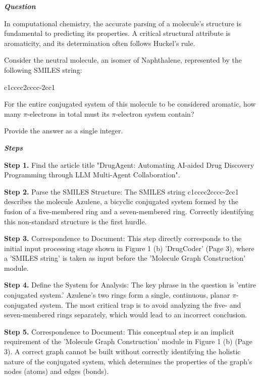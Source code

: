 \begin{tcolorbox}[
    breakable,
    title=Example of Scientific Deep Research in Chemistry,
    colback=LighterGray,
    colframe=DeepPurple,
    colbacktitle=DeepPurple,
    coltitle=White,
]
\textbf{\emph{\textcolor{DeepPurple}{Question}}}

In computational chemistry, the accurate parsing of a molecule's structure is fundamental to predicting its properties. A critical structural attribute is aromaticity, and its determination often follows Huckel's rule.

Consider the neutral molecule, an isomer of Naphthalene, represented by the following SMILES string:

c1cccc2cccc-2cc1

For the entire conjugated system of this molecule to be considered aromatic, how many $\pi$-electrons in total must its $\pi$-electron system contain?

Provide the answer as a single integer.

\textbf{\emph{\textcolor{DeepPurple}{Steps}}}

\textbf{\textcolor{CaseOrange}{Step 1.}} Find the article title "DrugAgent: Automating AI-aided Drug Discovery Programming through LLM Multi-Agent Collaboration".

\textbf{\textcolor{CaseOrange}{Step 2.}} Parse the SMILES Structure: The SMILES string c1cccc2cccc-2cc1 describes the molecule Azulene, a bicyclic conjugated system formed by the fusion of a five-membered ring and a seven-membered ring. Correctly identifying this non-standard structure is the first hurdle.

\textbf{\textcolor{CaseOrange}{Step 3.}} Correspondence to Document: This step directly corresponds to the initial input processing stage shown in Figure 1 (b) 'DrugCoder' (Page 3), where a 'SMILES string' is taken as input before the 'Molecule Graph Construction' module.

\textbf{\textcolor{CaseOrange}{Step 4.}} Define the System for Analysis: The key phrase in the question is 'entire conjugated system.' Azulene's two rings form a single, continuous, planar $\pi$-conjugated system. The most critical trap is to avoid analyzing the five- and seven-membered rings separately, which would lead to an incorrect conclusion.

\textbf{\textcolor{CaseOrange}{Step 5.}} Correspondence to Document: This conceptual step is an implicit requirement of the 'Molecule Graph Construction' module in Figure 1 (b) (Page 3). A correct graph cannot be built without correctly identifying the holistic nature of the conjugated system, which determines the properties of the graph's nodes (atoms) and edges (bonds).


\end{tcolorbox}
